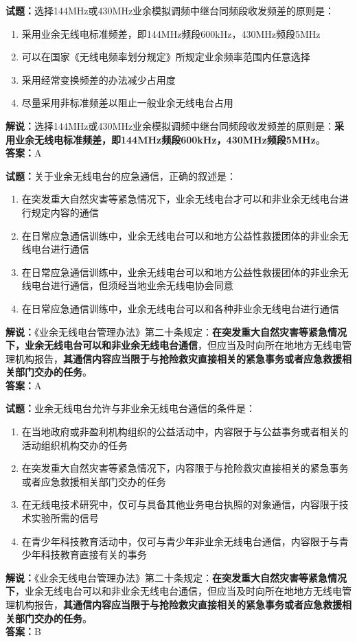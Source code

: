 \documentclass{ctexbook}
\begin{document}
\bigskip


\noindent\textbf{试题：}选择144MHz或430MHz业余模拟调频中继台同频段收发频差的原则是：
\begin{enumerate}[leftmargin=3em]
\item 采用业余无线电标准频差，即144MHz频段600kHz，430MHz频段5MHz
\item 可以在国家《无线电频率划分规定》所规定业余频率范围内任意选择
\item 采用经常变换频差的办法减少占用度
\item 尽量采用非标准频差以阻止一般业余无线电台占用
\end{enumerate}
\noindent\textbf{解说：}选择144MHz或430MHz业余模拟调频中继台同频段收发频差的原则是：\textbf{采用业余无线电标准频差，即144MHz频段600kHz，430MHz频段5MHz}。\\\noindent\textbf{答案：}A


\bigskip


\noindent\textbf{试题：}关于业余无线电台的应急通信，正确的叙述是：
\begin{enumerate}[leftmargin=3em]
\item 在突发重大自然灾害等紧急情况下，业余无线电台才可以和非业余无线电台进行规定内容的通信
\item 在日常应急通信训练中，业余无线电台可以和地方公益性救援团体的非业余无线电台进行通信
\item 在日常应急通信训练中，业余无线电台可以和地方公益性救援团体的非业余无线电台进行通信，但须经当地业余无线电协会同意
\item 在日常应急通信训练中，业余无线电台可以和各种非业余无线电台进行通信
\end{enumerate}
\noindent\textbf{解说：}《业余无线电台管理办法》第二十条规定：\textbf{在突发重大自然灾害等紧急情况下，业余无线电台可以和非业余无线电台通信}，但应当及时向所在地地方无线电管理机构报告，\textbf{其通信内容应当限于与抢险救灾直接相关的紧急事务或者应急救援相关部门交办的任务}。\\\noindent\textbf{答案：}A



\bigskip


\noindent\textbf{试题：}业余无线电台允许与非业余无线电台通信的条件是：
\begin{enumerate}[leftmargin=3em]
\item 在当地政府或非盈利机构组织的公益活动中，内容限于与公益事务或者相关的活动组织机构交办的任务
\item 在突发重大自然灾害等紧急情况下，内容限于与抢险救灾直接相关的紧急事务或者应急救援相关部门交办的任务
\item 在无线电技术研究中，仅可与具备其他业务电台执照的对象通信，内容限于技术实验所需的信号
\item 在青少年科技教育活动中，仅可与青少年非业余无线电台通信，内容限于与青少年科技教育直接有关的事务
\end{enumerate}
\noindent\textbf{解说：}《业余无线电台管理办法》第二十条规定：\textbf{在突发重大自然灾害等紧急情况下}，业余无线电台可以和非业余无线电台通信，但应当及时向所在地地方无线电管理机构报告，\textbf{其通信内容应当限于与抢险救灾直接相关的紧急事务或者应急救援相关部门交办的任务}。\\\noindent\textbf{答案：}B
\end{document}

